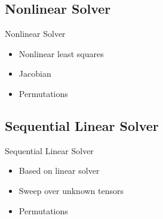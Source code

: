 \subsection{Nonlinear Solver}
\begin{frame}{Nonlinear Solver}
    \begin{itemize}
        \item Nonlinear least squares
        \item Jacobian
        \item Permutations
    \end{itemize}
\end{frame}

\subsection{Sequential Linear Solver}
\begin{frame}{Sequential Linear Solver}
    \begin{itemize}
        \item Based on linear solver
        \item Sweep over unknown tensors
        \item Permutations
    \end{itemize}
\end{frame}